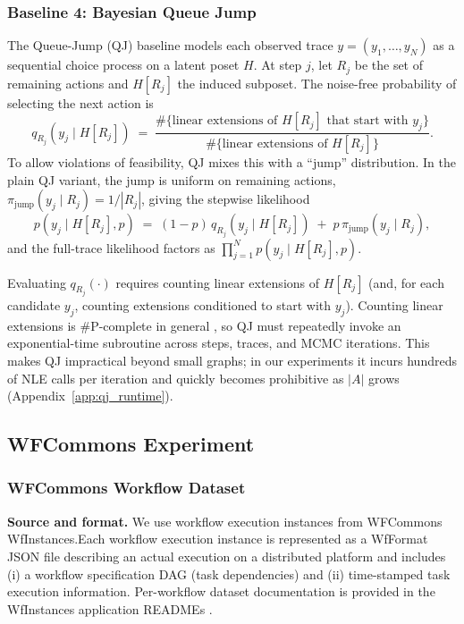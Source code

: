 \documentclass{article}
\theoremstyle{plain}
\theoremstyle{definition}
\theoremstyle{remark}
\begin{document}
\subsubsection{Baseline 4: Bayesian Queue Jump}
\label{app:alog_base_qj}

The Queue-Jump (QJ) baseline \citep{nicholls2024bayesianinferencepartialorders} models each observed trace $y=(y_1,\ldots,y_N)$ as a sequential choice process on a latent
poset $H$. At step $j$, let $R_j$ be the set of remaining actions and $H[R_j]$ the induced subposet. The noise-free probability
of selecting the next action is
\[
q_{R_j}(y_j \mid H[R_j]) \;=\; \frac{\#\{\text{linear extensions of }H[R_j]\text{ that start with }y_j\}}{\#\{\text{linear extensions of }H[R_j]\}} .
\]
To allow violations of feasibility, QJ mixes this with a ``jump'' distribution. In the plain QJ variant, the jump is uniform on
remaining actions, $\pi_{\text{jump}}(y_j\mid R_j)=1/|R_j|$, giving the stepwise likelihood
\[
p(y_j\mid H[R_j],p) \;=\; (1-p)\,q_{R_j}(y_j\mid H[R_j]) \;+\; p\,\pi_{\text{jump}}(y_j\mid R_j),
\]
and the full-trace likelihood factors as $\prod_{j=1}^{N} p(y_j\mid H[R_j],p)$.

Evaluating $q_{R_j}(\cdot)$ requires counting linear extensions of $H[R_j]$ (and, for each candidate $y_j$, counting extensions
conditioned to start with $y_j$). Counting linear extensions is \#P-complete in general \citep{brightwell1991counting}, so QJ
must repeatedly invoke an exponential-time subroutine across steps, traces, and MCMC iterations. This makes QJ impractical
beyond small graphs; in our experiments it incurs hundreds of NLE calls per iteration and quickly becomes prohibitive as $|A|$
grows (Appendix~\ref{app:qj_runtime}).



\subsection{WFCommons Experiment}
\label{app:wfcommons_details}
\subsubsection{WFCommons Workflow Dataset}\label{app:wfcommons_dataset}

\noindent \textbf{Source and format.}
We use workflow execution instances from WFCommons WfInstances.Each workflow execution instance is represented as a WfFormat JSON file describing an actual execution on a
distributed platform and includes (i) a workflow specification DAG (task dependencies) and (ii) time-stamped
task execution information.
Per-workflow dataset documentation is provided in the WfInstances application READMEs
\citep{wfcommons_srasearch}.
\end{document}
